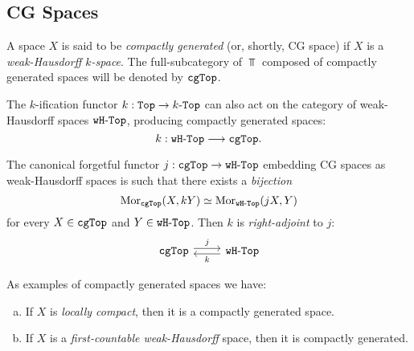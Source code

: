 \subsection{CG Spaces}

\begin{definition}
    \label{def:compactly-generated}
    A space \(X\) is said to be \emph{compactly generated} (or, shortly, CG space)
    if \(X\) is a \emph{weak-Hausdorff \(k\)-space}. The full-subcategory of
    \(\Top\) composed of compactly generated spaces will be denoted by \({\texttt{cgTop}}\).
\end{definition}

The \(k\)-ification functor \(k: {\texttt{Top}} \to {k\text{-}\texttt{Top}}\) can also act on the category
of weak-Hausdorff spaces \({\texttt{wH}\text{-}\texttt{Top}}\), producing compactly generated spaces:
\[
    k: {\texttt{wH}\text{-}\texttt{Top}} \longrightarrow {\texttt{cgTop}}.
\]

\begin{lemma}
    \label{lem:cgTop-and-wHTop}
    The canonical forgetful functor \(j: {\texttt{cgTop}} \to {\texttt{wH}\text{-}\texttt{Top}}\) embedding CG
    spaces as weak-Hausdorff spaces is such that there exists a \emph{bijection}
    \[
        \operatorname{Mor}_{{\texttt{cgTop}}}(X, k Y) \simeq \operatorname{Mor}_{{\texttt{wH}\text{-}\texttt{Top}}}(j X, Y)
    \]
    for every \(X \in {\texttt{cgTop}}\) and \(Y \in {\texttt{wH}\text{-}\texttt{Top}}\). Then \(k\) is
    \emph{right-adjoint} to \(j\):
    \[
        \begin{tikzcd}
            \cgTop \ar[r, shift left, "j"]
            &\wHTop \ar[l, shift left, "k"]
        \end{tikzcd}
    \]
\end{lemma}

\begin{example}
    \label{exp:compactly-generated-fst-ctbl-lcly-cpct-and-wk-haus}
    As examples of compactly generated spaces we have:
    \begin{enumerate}[(a)]\setlength\itemsep{0em}
        \item If \(X\) is \emph{locally compact}, then it is a compactly generated
              space.

        \item If \(X\) is a \emph{first-countable weak-Hausdorff} space, then it is
              compactly generated.
    \end{enumerate}
\end{example}

